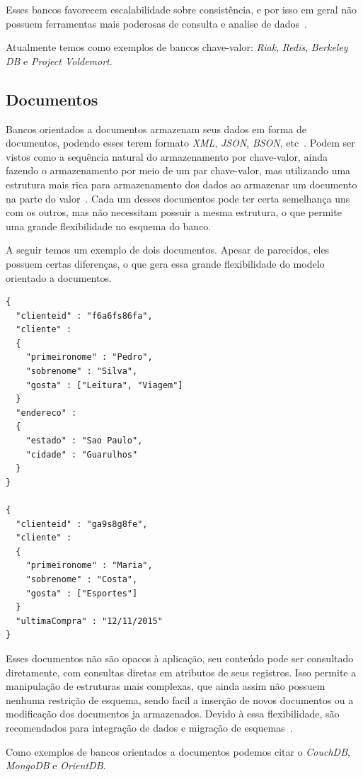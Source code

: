 Esses bancos favorecem escalabilidade sobre consistência, e por isso em geral não possuem ferramentas mais poderosas de consulta e analise de dados~\cite{chrisnosql}.

Atualmente temos como exemplos de bancos chave-valor: \emph{Riak}, \emph{Redis}, \emph{Berkeley DB} e \emph{Project Voldemort}.

\subsection*{Documentos}
Bancos orientados a documentos armazenam seus dados em forma de documentos, podendo esses terem formato \emph{XML}, \emph{JSON}, \emph{BSON}, etc~\cite{pramod}. Podem ser vistos como a sequência natural do armazenamento por chave-valor, ainda fazendo o armazenamento por meio de um par chave-valor, mas utilizando uma estrutura mais rica para armazenamento dos dados ao armazenar um documento na parte do valor~\cite{chrisnosql}. Cada um desses documentos pode ter certa semelhança uns com os outros, mas não necessitam possuir a mesma estrutura, o que permite uma grande flexibilidade no esquema do banco.

A seguir temos um exemplo de dois documentos. Apesar de parecidos, eles possuem certas diferenças, o que gera essa grande flexibilidade do modelo orientado a documentos.

\begin{lstlisting}
{
  "clienteid" : "f6a6fs86fa",
  "cliente" :
  {
    "primeironome" : "Pedro",
    "sobrenome" : "Silva", 
    "gosta" : ["Leitura", "Viagem"]
  }
  "endereco" : 
  {
    "estado" : "Sao Paulo",
    "cidade" : "Guarulhos"
  }
}

{
  "clienteid" : "ga9s8g8fe",
  "cliente" :
  {
    "primeironome" : "Maria",
    "sobrenome" : "Costa", 
    "gosta" : ["Esportes"]
  }
  "ultimaCompra" : "12/11/2015"
}
\end{lstlisting}

Esses documentos não são opacos à aplicação, seu conteúdo pode ser consultado diretamente, com consultas diretas em atributos de seus registros. Isso permite a manipulação de estruturas mais complexas, que ainda assim não possuem nenhuma restrição de esquema, sendo facil a inserção de novos documentos ou a modificação dos documentos ja armazenados. Devido à essa flexibilidade, são recomendados para integração de dados e migração de esquemas~\cite{nosqleval}. 

Como exemplos de bancos orientados a documentos podemos citar o \emph{CouchDB}, \emph{MongoDB} e \emph{OrientDB}.

